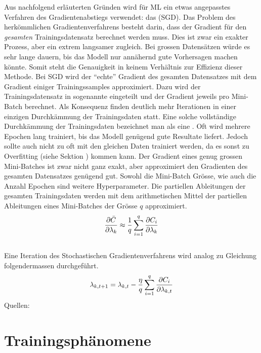 Aus nachfolgend erläuterten Gründen wird für ML ein etwas angepasstes
Verfahren des Gradientenabstiegs verwendet: das  (SGD).
Das Problem des herkömmlichen Gradientenverfahrens besteht darin, dass der
Gradient für den \textit{gesamten} Trainingsdatensatz berechnet werden muss.
Dies ist zwar ein exakter Prozess, aber ein extrem langsamer zugleich.
Bei grossen Datensätzen würde es sehr lange dauern, bis das Modell nur annähernd gute Vorhersagen machen könnte.
Somit steht die Genauigkeit in keinem Verhältnis zur Effizienz dieser Methode.
\para{}
Bei SGD wird der ``echte'' Gradient des gesamten Datensatzes mit dem Gradient einiger Trainingssamples approximiert.
Dazu wird der Trainingsdatensatz in sogenannte  eingeteilt und der Gradient jeweils pro Mini-Batch berechnet.
Als Konsequenz finden deutlich mehr Iterationen in einer einzigen
Durchkämmung der Trainingsdaten statt. Eine solche vollständige Durchkämmung der Trainingsdaten
bezeichnet man als eine .
Oft wird mehrere Epochen lang trainiert, bis das Modell genügend gute Resultate
liefert. Jedoch sollte auch nicht zu oft mit den gleichen Daten trainiert
werden, da es sonst zu Overfitting (siehe Sektion ) kommen kann.
Der Gradient eines genug grossen Mini-Batches ist zwar nicht ganz exakt, aber
approximiert den Gradienten des gesamten Datensatzes genügend gut.
Sowohl die Mini-Batch Grösse, wie auch die Anzahl Epochen sind weitere Hyperparameter.
\para{}
Die partiellen Ableitungen der gesamten Trainingsdaten werden mit dem
arithmetischen Mittel der partiellen Ableitungen eines Mini-Batches der Grösse $q$ approximiert.
\\
\begin{equation}\label{eq:minibatch_deriv}
  \frac{\partial \bar{C}}{\partial \lambda_k} \approx \frac{1}{q}\sum_{i=1}^{q} \frac{\partial C_i}{\partial \lambda_k}
\end{equation}
\\
Eine Iteration des Stochastischen Gradientenverfahrens wird analog zu Gleichung  folgendermassen durchgeführt.
\\
\begin{equation}\label{eq:sgd}
  \lambda_{k,t+1} = \lambda_{k,t} - \frac{\eta}{q} \sum_{i=1}^{q} \frac{\partial C_i}{\partial \lambda_{k,t}}
\end{equation}
\para{}
Quellen: \cite{Nielsen} \cite{book:hands-on}

\section{Trainingsphänomene}

